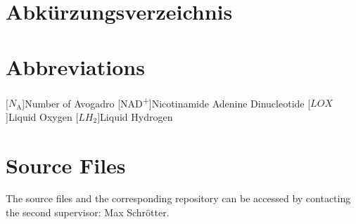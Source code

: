 %
%

\appendix
\pagestyle{appendixstyle}

%
%

\listoffigures

%
%

\listoftables

%
%

\listofalgorithms

\clearpage

%
%

{
\chapter{Abkürzungsverzeichnis}
}{
\chapter{Abbreviations}
}
\begin{acronym}[TDMA]
 [\ensuremath{N_{\mathrm A}}]{Number of Avogadro}
 [NAD\textsuperscript{+}]{Nicotinamide Adenine Dinucleotide}
 [\ensuremath{LOX}]{Liquid Oxygen}%
 [\ensuremath{LH_2}]{Liquid Hydrogen}%
\end{acronym}

\chapter{Source Files}
The source files and the corresponding repository can be accessed by contacting the second supervisor: Max Schrötter.

%
%

\printbibliography

\printindex 
